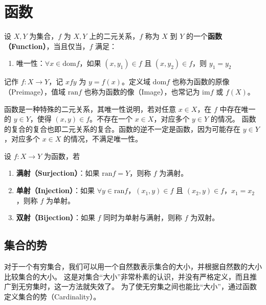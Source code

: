 \section{函数}
\begin{definition}[函数 Function]
    设 $ X, Y $ 为集合，$ f $ 为 $ X, Y $ 上的二元关系，$f$ 称为 $ X $ 到 $ Y $ 的一个\textbf{函数（Function）}，当且仅当，$f$ 满足：
    \begin{enumerate}
        \item 唯一性：$ \forall x \in \mathrm{dom} f $，如果 $ (x,y_1)\in f  $ 且 $ (x,y_2)\in f $，则 $ y_1 = y_2 $
    \end{enumerate}
    记作 $ f: X \to Y $，记 $xfy$ 为 $y = f(x) $。定义域 $\mathrm{dom}f$ 也称为函数的原像（Preimage），值域 $\mathrm{ran}f$ 也称为函数的像（Image），也常记为 $\mathrm{im}f$ 或 $f(X)$。
\end{definition}

\begin{note}
    函数是一种特殊的二元关系，其唯一性说明，若对任意 $ x\in X $，在 $ f $ 中存在唯一的 $ y\in Y $，使得 $ (x,y)\in f $。不存在一个 $ x\in X $，对应多个 $ y\in Y $ 的情况。
    函数的复合的复合也即二元关系的复合。函数的逆不一定是函数，因为可能存在 $ y\in Y $，对应多个 $ x\in X $ 的情况，不满足唯一性。
\end{note}
\vspace{1em}

\begin{definition}
    设 $ f: X \to Y $ 为函数，若
    \begin{enumerate}
        \item \textbf{满射（Surjection）}：如果 $ \mathrm{ran}f = Y $，则称 $ f $ 为满射。
        \item \textbf{单射（Injection）}：如果 $ \forall y \in \mathrm{ran} f $，$ (x_1,y)\in f $ 且 $ (x_2,y)\in f $，$ x_1 = x_2 $，则称 $ f $ 为单射。
        \item \textbf{双射（Bijection）}：如果 $ f $ 同时为单射与满射，则称 $ f $ 为双射。
    \end{enumerate}
\end{definition}
\vspace{0.5em}

\subsection{集合的势}

对于一个有穷集合，我们可以用一个自然数表示集合的大小，并根据自然数的大小比较集合的大小。
这是对集合“大小”非常朴素的认识，并没有严格定义，而且推广到无穷集时，这一方法就失效了。
为了使无穷集之间也能比“大小”，通过函数定义集合的势（Cardinality）。
\vspace{0.5em}

